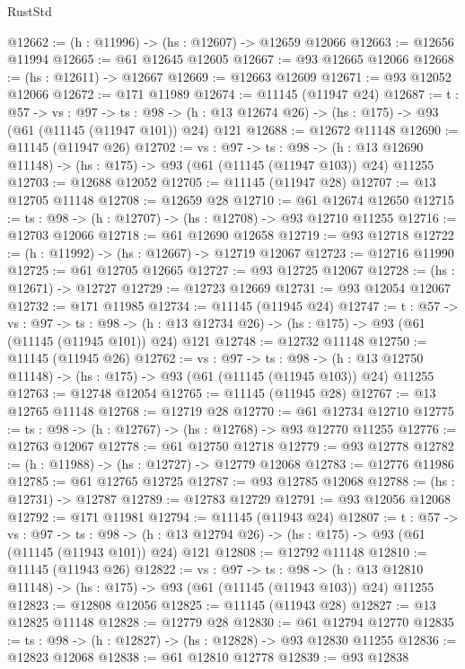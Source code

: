 \begin{lexlean}{RustStd}
\begin{coremodule}
@12662 := (h : @11996) -> (hs : @12607) -> @12659 @12066
@12663 := @12656 @11994
@12665 := @61 @12645 @12605
@12667 := @93 @12665 @12066
@12668 := (hs : @12611) -> @12667
@12669 := @12663 @12609
@12671 := @93 @12052 @12066
@12672 := @171 @11989
@12674 := @11145 (@11947 @24)
@12687 := {t : @57} ->
  {vs : @97} ->
  {ts : @98} -> (h : @13 @12674 @26) -> (hs : @175) -> @93 (@61 (@11145 (@11947 @101)) @24) @121
@12688 := @12672 @11148
@12690 := @11145 (@11947 @26)
@12702 := {vs : @97} ->
  {ts : @98} ->
  (h : @13 @12690 @11148) -> (hs : @175) -> @93 (@61 (@11145 (@11947 @103)) @24) @11255
@12703 := @12688 @12052
@12705 := @11145 (@11947 @28)
@12707 := @13 @12705 @11148
@12708 := @12659 @28
@12710 := @61 @12674 @12650
@12715 := {ts : @98} -> (h : @12707) -> (hs : @12708) -> @93 @12710 @11255
@12716 := @12703 @12066
@12718 := @61 @12690 @12658
@12719 := @93 @12718
@12722 := (h : @11992) -> (hs : @12667) -> @12719 @12067
@12723 := @12716 @11990
@12725 := @61 @12705 @12665
@12727 := @93 @12725 @12067
@12728 := (hs : @12671) -> @12727
@12729 := @12723 @12669
@12731 := @93 @12054 @12067
@12732 := @171 @11985
@12734 := @11145 (@11945 @24)
@12747 := {t : @57} ->
  {vs : @97} ->
  {ts : @98} -> (h : @13 @12734 @26) -> (hs : @175) -> @93 (@61 (@11145 (@11945 @101)) @24) @121
@12748 := @12732 @11148
@12750 := @11145 (@11945 @26)
@12762 := {vs : @97} ->
  {ts : @98} ->
  (h : @13 @12750 @11148) -> (hs : @175) -> @93 (@61 (@11145 (@11945 @103)) @24) @11255
@12763 := @12748 @12054
@12765 := @11145 (@11945 @28)
@12767 := @13 @12765 @11148
@12768 := @12719 @28
@12770 := @61 @12734 @12710
@12775 := {ts : @98} -> (h : @12767) -> (hs : @12768) -> @93 @12770 @11255
@12776 := @12763 @12067
@12778 := @61 @12750 @12718
@12779 := @93 @12778
@12782 := (h : @11988) -> (hs : @12727) -> @12779 @12068
@12783 := @12776 @11986
@12785 := @61 @12765 @12725
@12787 := @93 @12785 @12068
@12788 := (hs : @12731) -> @12787
@12789 := @12783 @12729
@12791 := @93 @12056 @12068
@12792 := @171 @11981
@12794 := @11145 (@11943 @24)
@12807 := {t : @57} ->
  {vs : @97} ->
  {ts : @98} -> (h : @13 @12794 @26) -> (hs : @175) -> @93 (@61 (@11145 (@11943 @101)) @24) @121
@12808 := @12792 @11148
@12810 := @11145 (@11943 @26)
@12822 := {vs : @97} ->
  {ts : @98} ->
  (h : @13 @12810 @11148) -> (hs : @175) -> @93 (@61 (@11145 (@11943 @103)) @24) @11255
@12823 := @12808 @12056
@12825 := @11145 (@11943 @28)
@12827 := @13 @12825 @11148
@12828 := @12779 @28
@12830 := @61 @12794 @12770
@12835 := {ts : @98} -> (h : @12827) -> (hs : @12828) -> @93 @12830 @11255
@12836 := @12823 @12068
@12838 := @61 @12810 @12778
@12839 := @93 @12838

\end{coremodule}
\end{lexlean}
